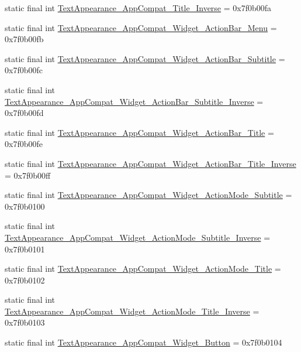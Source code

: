 \begin{CompactItemize}
\item 
static final int \hyperlink{classandroid_1_1support_1_1v7_1_1cardview_1_1_r_1_1style_170edc77a03395b38def80108109f376}{TextAppearance\_\-AppCompat\_\-Title\_\-Inverse} = 0x7f0b00fa
\item 
static final int \hyperlink{classandroid_1_1support_1_1v7_1_1cardview_1_1_r_1_1style_fa16db3377b37dd0aa51e2007143ce8f}{TextAppearance\_\-AppCompat\_\-Widget\_\-ActionBar\_\-Menu} = 0x7f0b00fb
\item 
static final int \hyperlink{classandroid_1_1support_1_1v7_1_1cardview_1_1_r_1_1style_e190c12b71e804f5e51a14993b4b8c5f}{TextAppearance\_\-AppCompat\_\-Widget\_\-ActionBar\_\-Subtitle} = 0x7f0b00fc
\item 
static final int \hyperlink{classandroid_1_1support_1_1v7_1_1cardview_1_1_r_1_1style_748f09fe64ff48c3afa7e4c2e5041446}{TextAppearance\_\-AppCompat\_\-Widget\_\-ActionBar\_\-Subtitle\_\-Inverse} = 0x7f0b00fd
\item 
static final int \hyperlink{classandroid_1_1support_1_1v7_1_1cardview_1_1_r_1_1style_ea5b37f16535632729c4f562d785ebb8}{TextAppearance\_\-AppCompat\_\-Widget\_\-ActionBar\_\-Title} = 0x7f0b00fe
\item 
static final int \hyperlink{classandroid_1_1support_1_1v7_1_1cardview_1_1_r_1_1style_ad835952cccec701757ad0ad130e4c66}{TextAppearance\_\-AppCompat\_\-Widget\_\-ActionBar\_\-Title\_\-Inverse} = 0x7f0b00ff
\item 
static final int \hyperlink{classandroid_1_1support_1_1v7_1_1cardview_1_1_r_1_1style_33e0ad7f2353babdea85529de048ec79}{TextAppearance\_\-AppCompat\_\-Widget\_\-ActionMode\_\-Subtitle} = 0x7f0b0100
\item 
static final int \hyperlink{classandroid_1_1support_1_1v7_1_1cardview_1_1_r_1_1style_232620941a4a2a7efd162482c4a1d7b8}{TextAppearance\_\-AppCompat\_\-Widget\_\-ActionMode\_\-Subtitle\_\-Inverse} = 0x7f0b0101
\item 
static final int \hyperlink{classandroid_1_1support_1_1v7_1_1cardview_1_1_r_1_1style_6e49f5dc9f39eaf6324abb5854c241da}{TextAppearance\_\-AppCompat\_\-Widget\_\-ActionMode\_\-Title} = 0x7f0b0102
\item 
static final int \hyperlink{classandroid_1_1support_1_1v7_1_1cardview_1_1_r_1_1style_40f14b282e4b690c6b257c9dcad9643e}{TextAppearance\_\-AppCompat\_\-Widget\_\-ActionMode\_\-Title\_\-Inverse} = 0x7f0b0103
\item 
static final int \hyperlink{classandroid_1_1support_1_1v7_1_1cardview_1_1_r_1_1style_dc2ade60706a4f1ff185a3e125bc661f}{TextAppearance\_\-AppCompat\_\-Widget\_\-Button} = 0x7f0b0104

\end{CompactItemize}
